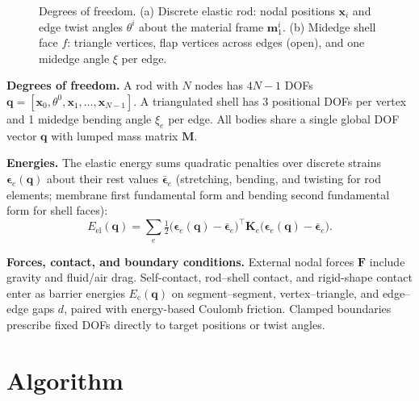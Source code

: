 \documentclass[letterpaper, 10 pt, conference]{ieeeconf}
\begin{document}
\begin{figure}[t]
    \caption{Degrees of freedom. (a) Discrete elastic rod: nodal positions $\mathbf{x}_i$ and edge twist angles $\theta^i$ about the material frame $\mathbf{m}_1^i$. (b) Midedge shell face $f$: triangle vertices, flap vertices across edges (open), and one midedge angle $\xi$ per edge.}
    \label{fig:model}
\end{figure}

\textbf{Degrees of freedom.}
A rod with $N$ nodes has $4N-1$ DOFs $\mathbf{q} = [\mathbf{x}_0, \theta^0, \mathbf{x}_1, \dots, \mathbf{x}_{N-1}]$.
A triangulated shell has 3 positional DOFs per vertex and 1 midedge bending angle $\xi_e$ per edge.
All bodies share a single global DOF vector $\mathbf{q}$ with lumped mass matrix $\mathbf{M}$.

\textbf{Energies.}
The elastic energy sums quadratic penalties over discrete strains $\boldsymbol{\epsilon}_e(\mathbf{q})$ about their rest values $\bar{\boldsymbol{\epsilon}}_e$ (stretching, bending, and twisting for rod elements; membrane first fundamental form and bending second fundamental form for shell faces):
\begin{equation}
    E_\text{el}(\mathbf{q}) = \sum_{e} \tfrac{1}{2}\big(\boldsymbol{\epsilon}_e(\mathbf{q}) - \bar{\boldsymbol{\epsilon}}_e\big)^{\!\top} \mathbf{K}_e \big(\boldsymbol{\epsilon}_e(\mathbf{q}) - \bar{\boldsymbol{\epsilon}}_e\big).
\end{equation}

\textbf{Forces, contact, and boundary conditions.}
External nodal forces $\mathbf{F}$ include gravity and fluid/air drag.
Self-contact, rod--shell contact, and rigid-shape contact enter as barrier energies $E_\text{c}(\mathbf{q})$ on segment--segment, vertex--triangle, and edge--edge gaps $d$, paired with energy-based Coulomb friction.
Clamped boundaries prescribe fixed DOFs directly to target positions or twist angles.

\section{Algorithm}
\end{document}
